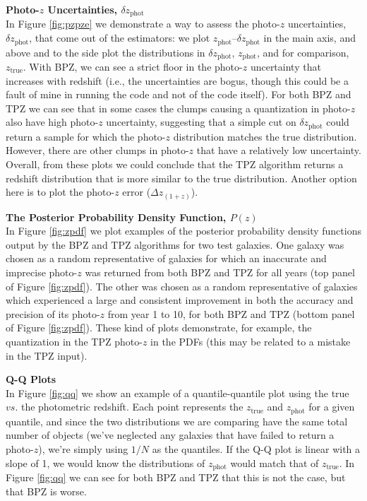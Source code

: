 \documentclass[DM,lsstdraft,toc]{lsstdoc}
\begin{document}
\smallskip \noindent \textbf{Photo-$z$ Uncertainties, $\delta z_\mathrm{phot}$} \\
In Figure \ref{fig:pzpze} we demonstrate a way to assess the photo-$z$ uncertainties, $\delta z_\mathrm{phot}$, that come out of the estimators: we plot $z_\mathrm{phot}$--$\delta z_\mathrm{phot}$ in the main axis, and above and to the side plot the distributions in $\delta z_\mathrm{phot}$, $z_\mathrm{phot}$, and for comparison, $z_\mathrm{true}$. With BPZ, we can see a strict floor in the photo-$z$ uncertainty that increases with redshift (i.e., the uncertainties are bogus, though this could be a fault of mine in running the code and not of the code itself). For both BPZ and TPZ we can see that in some cases the clumps causing a quantization in photo-$z$ also have high photo-$z$ uncertainty, suggesting that a simple cut on $\delta z_\mathrm{phot}$ could return a sample for which the photo-$z$ distribution matches the true distribution. However, there are other clumps in photo-$z$ that have a relatively low uncertainty. Overall, from these plots we could conclude that the TPZ algorithm returns a redshift distribution that is more similar to the true distribution. Another option here is to plot the photo-$z$ error ($\Delta z_{(1+z)}$).

\smallskip \noindent \textbf{The Posterior Probability Density Function, $P(z)$} \\
In Figure \ref{fig:zpdf} we plot examples of the posterior probability density functions output by the BPZ and TPZ algorithms for two test galaxies. One galaxy was chosen as a random representative of galaxies for which an inaccurate and imprecise photo-$z$ was returned from both BPZ and TPZ for all years (top panel of Figure \ref{fig:zpdf}). The other was chosen as a random representative of galaxies which experienced a large and consistent improvement in both the accuracy and precision of its photo-$z$ from year 1 to 10, for both BPZ and TPZ (bottom panel of Figure \ref{fig:zpdf}). These kind of plots demonstrate, for example, the quantization in the TPZ photo-$z$ in the PDFs (this may be related to a mistake in the TPZ input).

\smallskip \noindent \textbf{Q-Q Plots} \\
In Figure \ref{fig:qq} we show an example of a quantile-quantile plot using the true $vs.$ the photometric redshift. Each point represents the $z_\mathrm{true}$ and $z_\mathrm{phot}$ for a given quantile, and since the two distributions we are comparing have the same total number of objects (we've neglected any galaxies that have failed to return a photo-$z$), we're simply using $1/N$ as the quantiles. If the Q-Q plot is linear with a slope of 1, we would know the distributions of $z_\mathrm{phot}$ would match that of $z_\mathrm{true}$. In Figure \ref{fig:qq} we can see for both BPZ and TPZ that this is not the case, but that BPZ is worse.
\end{document}
